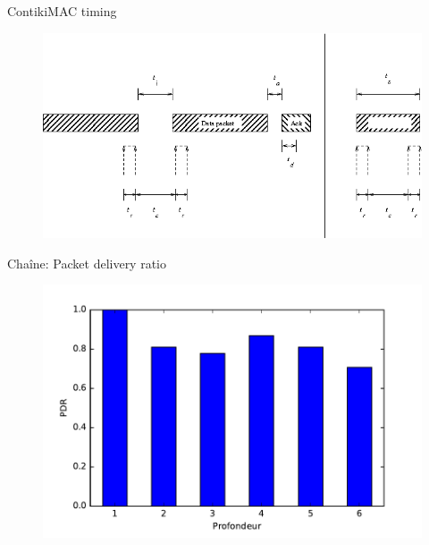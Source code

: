 \begin{frame}{ContikiMAC timing}
  \begin{figure}
    \centering
    \includegraphics[width=\textwidth]{figures/contikimac_timing.png}
  \end{figure}
\end{frame}

\begin{frame}{Chaîne: Packet delivery ratio}
  \begin{figure}
    \centering
    \includegraphics[width=\textwidth]{figures/new_pdr.pdf}
  \end{figure}
\end{frame}

